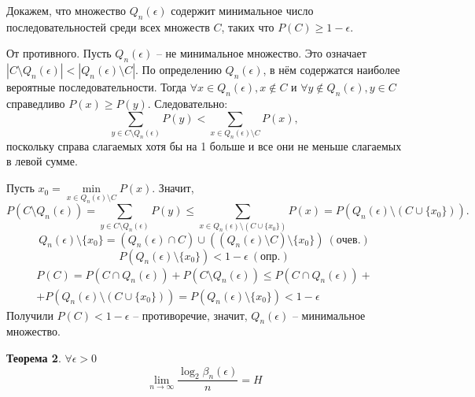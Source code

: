 Докажем, что множество $Q_n(\epsilon)$ содержит минимальное число последовательностей среди всех множеств $C$, таких что $P(C) \ge 1 - \epsilon$. 

От противного. Пусть $Q_n(\epsilon)$ -- не минимальное множество. Это означает $|C \setminus Q_n(\epsilon)| < | Q_n(\epsilon) \setminus C|$. По определению $Q_n(\epsilon)$, в нём содержатся наиболее вероятные последовательности. Тогда $\forall x \in Q_n(\epsilon), x \not \in C$ и $\forall y \not \in Q_n(\epsilon), y \in C$ справедливо $P(x) \ge P(y)$. Следовательно:
$$\sum_{y \in C \setminus Q_n(\epsilon)} P(y) < \sum_{x \in Q_n(\epsilon) \setminus C} P(x),$$
поскольку справа слагаемых хотя бы на 1 больше и все они не меньше слагаемых в левой сумме.

Пусть $x_0 = \underset{{x \in Q_n(\epsilon) \setminus C}}{\min} P(x)$. Значит,
$$P(C \setminus Q_n(\epsilon)) = \sum_{y \in C \setminus Q_n(\epsilon)} P(y) \le \sum_{x \in Q_n(\epsilon) \setminus (C \cup \{x_0\})} P(x) = P(Q_n(\epsilon) \setminus (C \cup \{x_0\})).$$
$$Q_n(\epsilon) \setminus \{x_0\} = (Q_n(\epsilon) \cap C) \cup ((Q_n(\epsilon) \setminus C) \setminus \{x_0\})\  (очев.)$$
$$P(Q_n(\epsilon) \setminus \{x_0\}) < 1 - \epsilon\ (опр.)$$
\begin{multline*}
P(C) = P(C \cap Q_n(\epsilon)) + P(C \setminus Q_n(\epsilon)) \le P(C \cap Q_n(\epsilon)) + \\
+ P(Q_n(\epsilon) \setminus (C \cup \{x_0\})) = P(Q_n(\epsilon) \setminus \{x_0\}) < 1 - \epsilon
\end{multline*}
Получили $P(C) < 1 - \epsilon$ -- противоречие, значит, $Q_n(\epsilon)$ -- минимальное множество.

\textbf{Теорема 2}. $\forall \epsilon > 0$
$$\lim_{n \rightarrow \infty} \frac{\log_2 {\beta_n (\epsilon)}}{n} = H$$

